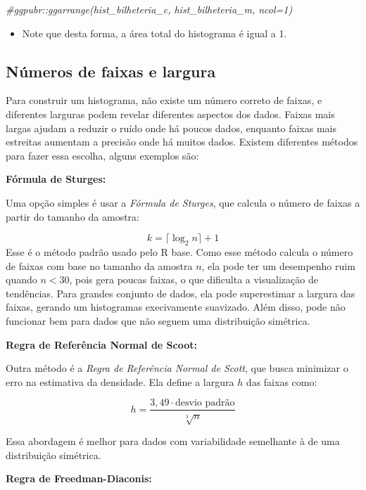 \documentclass[
]{book}
\newenvironment{Shaded}{\begin{snugshade}}{\end{snugshade}}
\newcommand{\CommentTok}[1]{\textcolor[rgb]{0.56,0.35,0.01}{\textit{#1}}}
\providecommand{\tightlist}{%
  \setlength{\itemsep}{0pt}\setlength{\parskip}{0pt}}
\begin{document}
\begin{Shaded}
\begin{Highlighting}[]
\CommentTok{\#ggpubr::ggarrange(hist\_bilheteria\_c, hist\_bilheteria\_m, ncol=1)}
\end{Highlighting}
\end{Shaded}

\begin{itemize}
\tightlist
\item
  Note que desta forma, a área total do histograma é igual a 1.
\end{itemize}

\subsection{Números de faixas e largura}\label{nuxfameros-de-faixas-e-largura}

Para construir um histograma, não existe um número correto de faixas, e diferentes larguras podem revelar diferentes aspectos dos dados. Faixas mais largas ajudam a reduzir o ruído onde há poucos dados, enquanto faixas mais estreitas aumentam a precisão onde há muitos dados. Existem diferentes métodos para fazer essa escolha, alguns exemplos são:

\textbf{Fórmula de Sturges:}

Uma opção simples é usar a \emph{Fórmula de Sturges}, que calcula o número de faixas a partir do tamanho da amostra:

\[
k = \lceil \log_2 n \rceil + 1
\]
Esse é o método padrão usado pelo R base. Como esse método calcula o número de faixas com base no tamanho da amostra \(n\), ela pode ter um desempenho ruim quando \(n < 30\), pois gera poucas faixas, o que dificulta a visualização de tendências. Para grandes conjunto de dados, ela pode superestimar a largura das faixas, gerando um histogramas execivamente suavizado. Além disso, pode não funcionar bem para dados que não seguem uma distribuição simétrica.

\textbf{Regra de Referência Normal de Scoot:}

Outra método é a \emph{Regra de Referência Normal de Scott}, que busca minimizar o erro na estimativa da densidade. Ela define a largura \(h\) das faixas como:

\[
h = \frac{3,49 \cdot \text{desvio padrão}}{\sqrt[3]{n}}
\]

Essa abordagem é melhor para dados com variabilidade semelhante à de uma distribuição simétrica.

\textbf{Regra de Freedman-Diaconis:}
\end{document}
